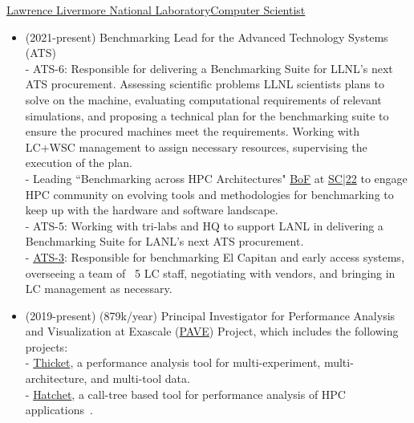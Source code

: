 		{\href{http://www.llnl.gov}{Lawrence Livermore National Laboratory}}{\href{https://people.llnl.gov/pearce8}{Computer Scientist}}{}{}
		{\begin{itemize}
		  \item (2021-present) Benchmarking Lead for the Advanced Technology Systems (ATS)  \\
			- ATS-6: Responsible for delivering a Benchmarking Suite for LLNL's next ATS procurement.
			     Assessing scientific problems LLNL scientists plans to solve on the machine, 
			     evaluating computational requirements of relevant simulations, 
			     and proposing a technical plan for the benchmarking suite to ensure the procured machines meet the requirements.  
			     Working with LC+WSC management to assign necessary resources, supervising the execution of the plan.  \\
			- Leading ``Benchmarking across HPC Architectures" \href{https://github.com/LLNL/benchmarking-BoF-SC22}{BoF} at 
				\href{https://sc22.supercomputing.org/presentation/?id=bof153&sess=sess329}{SC|22} to engage HPC community 
				on evolving tools and methodologies for benchmarking to keep up with the hardware and software landscape.  \\
			- ATS-5: Working with tri-labs and HQ to support LANL in delivering a Benchmarking Suite for LANL's next ATS procurement.  \\		  
		  	- \href{https://asc.llnl.gov/coral-2-benchmarks}{ATS-3}: 
				Responsible for benchmarking El Capitan and early access systems, overseeing a team of ~5 LC staff, 
				negotiating with vendors, and bringing in LC management as necessary. 
		  \item (2019-present) (879k/year) Principal Investigator for Performance Analysis and Visualization at Exascale
            (\href{https://computing.llnl.gov/projects/pave-performance-analysis-visualization-exascale}{PAVE}) Project,
	            which includes the following projects:\\
	            - \href{https://thicket.readthedocs.io/en/latest/}{Thicket}, a performance analysis tool for multi-experiment, 
	            	multi-architecture, and multi-tool data.\\
	            - \href{https://llnl-hatchet.readthedocs.io/en/latest/}{Hatchet}, a call-tree based tool for performance analysis 
	            	of HPC applications~\cite{pearce:ProToolsSC20,pearce:vpa18,pearce:jowog20}.\\

\end{itemize}}
